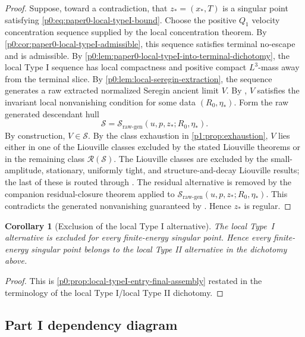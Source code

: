 \documentclass[11pt]{amsart}
\theoremstyle{plain}
\newtheorem{corollary}[corollary]{Corollary}
\theoremstyle{definition}
\theoremstyle{remark}
\numberwithin{equation}{section}
\newcommand{\calS}{\mathcal S}
\newcommand{\calR}{\mathcal R}
\begin{document}
\begin{proof}
Suppose, toward a contradiction, that \(z_*=(x_*,T)\) is a singular point
satisfying \eqref{p0:eq:paper0-local-typeI-bound}.
Choose the positive \(Q_1\) velocity concentration sequence supplied by the
local concentration theorem.  By
\cref{p0:cor:paper0-local-typeI-admissible}, this sequence satisfies
terminal no-escape and is admissible.
By \cref{p0:lem:paper0-local-typeI-into-terminal-dichotomy}, the local Type I
sequence has local compactness and positive compact \(L^3\)-mass away from the
terminal slice.
By \cref{p0:lem:local-seregin-extraction}, the sequence generates a raw
extracted normalized Seregin ancient limit \(V\).  By
, \(V\) satisfies the invariant
local nonvanishing condition for some data \((R_0,\eta_*)\).  Form the raw
generated descendant hull
\[
   \calS=\calS_{\mathrm{raw\text{-}gen}}(u,p,z_*;R_0,\eta_*).
\]
By construction, \(V\in\calS\).
By the class exhaustion in
\cref{p1:prop:exhaustion}, \(V\) lies either in one of the Liouville
classes excluded by the stated Liouville theorems or in the remaining class
\(\calR(\calS)\).  The Liouville classes are excluded by the small-amplitude,
stationary, uniformly tight, and structure-and-decay Liouville results; the
last of these is routed through .  The
residual alternative is removed by the companion residual-closure theorem
applied to
\(\calS_{\mathrm{raw\text{-}gen}}(u,p,z_*;R_0,\eta_*)\).
This contradicts the generated nonvanishing guaranteed by
.  Hence \(z_*\) is regular.
\end{proof}

\begin{corollary}[Exclusion of the local Type I alternative]
\label{p0:cor:paper0-local-typeII-after-local-typeI-reduction}
The local Type~I alternative is excluded for every finite-energy singular point.
Hence every finite-energy singular point belongs to the local Type II
alternative in the dichotomy above.
\end{corollary}

\begin{proof}
This is \cref{p0:prop:local-typeI-entry-final-assembly} restated in the terminology
of the local Type I/local Type II dichotomy.
\end{proof}


\subsection*{Part I dependency diagram}
\end{document}
